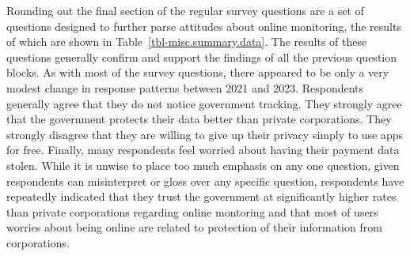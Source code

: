 \documentclass[
  letterpaper,
  DIV=11,
  numbers=noendperiod]{scrartcl}
\begin{document}
\hypertarget{tbl-track.summary.data}{}
\begin{table}
\caption{\label{tbl-track.summary.data}Attitudes regarding tracking summary data }\tabularnewline

\centering
{}
\end{table}

Rounding out the final section of the regular survey questions are a set
of questions designed to further parse attitudes about online
monitoring, the results of which are shown in
Table~\ref{tbl-misc.summary.data}. The results of these questions
generally confirm and support the findings of all the previous question
blocks. As with most of the survey questions, there appeared to be only
a very modest change in response patterns between 2021 and 2023.
Respondents generally agree that they do not notice government tracking.
They strongly agree that the government protects their data better than
private corporations. They strongly disagree that they are willing to
give up their privacy simply to use apps for free. Finally, many
respondents feel worried about having their payment data stolen. While
it is unwise to place too much emphasis on any one question, given
respondents can misinterpret or gloss over any specific question,
respondents have repeatedly indicated that they trust the government at
significantly higher rates than private corporations regarding online
montoring and that most of users worries about being online are related
to protection of their information from corporations.
\end{document}
